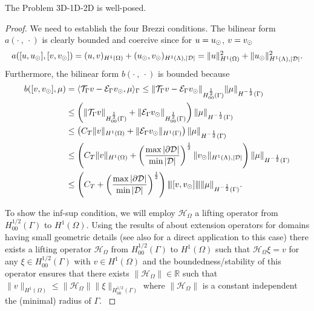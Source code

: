 \documentclass[r]{siamart171218}
\newcommand{\paolo}[1]{{\color{magenta}#1}}
\begin{document}
\begin{lemma}\label{lemma:prob1_boundedness} 
The Problem 3D-1D-2D is well-posed.
\end{lemma}
\begin{proof}
We need to establish the four Brezzi conditions. 
The bilinear form $a(\cdot \ , \ \cdot)$ is clearly bounded and coercive since 
for $u=u_{\odot}$, $v=v_{\odot}$
\begin{equation*}
a([u, u_{\odot}], [v, v_{\odot}]) 
= (u,v)_{H^1(\Omega)} + (u_{\odot}, v_{\odot})_{H^1(\Lambda), |\mathcal{D}|}
= \|u\|^2_{H^1(\Omega)} + \|u_{\odot}\|^2_{H^1(\Lambda),|\mathcal{D}|}.
\end{equation*}
Furthermore, the bilinear form $b(\cdot \ , \ \cdot)$ is bounded because
\begin{align*}
b([v, v_{\odot}], \mu)&= \langle {\mathcal{T}_\Gamma} v - \mathcal{E}_\Gamma v_{\odot} , \mu \rangle_\Gamma
\leq \|{\mathcal{T}_\Gamma} v - \mathcal{E}_\Gamma v_{\odot}\|_{H^{\frac 12}_{00}(\Gamma)}\|\mu\|_{H^{-\frac 12}(\Gamma)}\\
&\leq \left(\|{\mathcal{T}_\Gamma} v\|_{H^{\frac 12}_{00}(\Gamma)} + \|\mathcal{E}_\Gamma v_{\odot}\|_{H^{\frac 12}_{00}(\Gamma)}\right)\|\mu\|_{H^{-\frac 12}(\Gamma)} \\
&\leq \left(C_T \|v\|_{H^1(\Omega)} + \|\mathcal{E}_\Gamma v_{\odot}\|_{H^1(\Gamma)}\right)\|\mu\|_{H^{-\frac 12}(\Gamma)}\\
&\leq \left(C_T \|v\|_{H^1(\Omega)} + \left(\frac{\max |\partial\mathcal{D}|}{\min |\mathcal{D}|}\right)^{\frac 12} \|v_{\odot}\|_{H^1(\Lambda),|\mathcal{D}|}\right)\|\mu\|_{H^{-\frac 12}(\Gamma)}\\
&\leq \left( C_T + \left(\frac{\max |\partial\mathcal{D}|}{\min |\mathcal{D}|}\right)^{\frac 12}\right) {\left\vert\kern-0.25ex\left\vert\kern-0.25ex\left\vert [v,v_{\odot}] \right\vert\kern-0.25ex\right\vert\kern-0.25ex\right\vert}\|\mu\|_{H^{-\frac 12}(\Gamma)}.
\end{align*}



\paolo{
To show the inf-sup condition, we will employ $\mathcal{H}_\Omega$ 
a lifting operator from $H^{1/2}_{00}(\Gamma)$ to $H^1(\Omega)$.
Using the results of \cite{sauter1999extension} about extension operators for domains having small geometric details (see also \cite{laurino_m2an} for a direct application to this case) there exists a lifting operator $\mathcal{H}_\Omega$ from $H^{1/2}_{00}(\Gamma)$ to $H^1(\Omega)$ such that $\mathcal{H}_\Omega \xi = v$ for any $\xi \in H^{1/2}_{00}(\Gamma)$ with $v\in H^1(\Omega)$ and the boundedness/stability of this operator ensures that there exists 
$\| \mathcal{H}_\Omega \| \in \mathbb{R}$ such that
$\|v \|_{H^1(\Omega)}\leq \|\mathcal{H}_\Omega\| \|\xi \|_{H^{1/2}_{00}(\Gamma)}$
where $\| \mathcal{H}_\Omega \|$ is a constant independent the (minimal) radius of $\Gamma$.
}


\end{proof}
\end{document}
